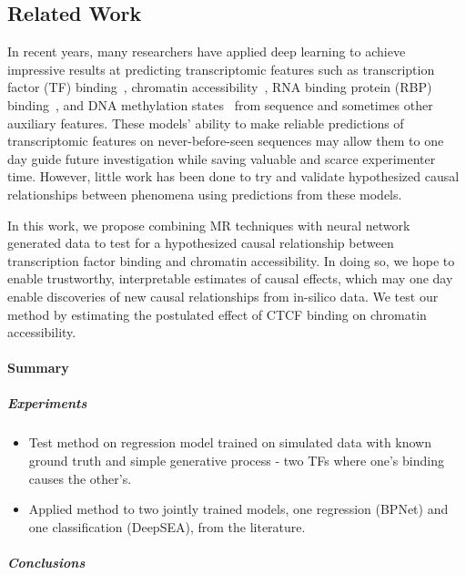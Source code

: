 \subsection{Related Work}
In recent years, many researchers have applied deep learning to achieve impressive results at predicting transcriptomic features such as transcription factor (TF) binding~\cite{alipanahi2015predicting, zhou2015predicting}, chromatin accessibility~\cite{kelley2016basset, zhou2015predicting}, RNA binding protein (RBP) binding~\cite{zheng2018deep, zhang2019deepdrbp, koo2018inferring}, and DNA methylation states~\cite{angermueller2017deepcpg} from sequence and sometimes other auxiliary features. These models' ability to make reliable predictions of transcriptomic features on never-before-seen sequences may allow them to one day guide future investigation while saving valuable and scarce experimenter time. However, little work has been done to try and validate hypothesized causal relationships between phenomena using predictions from these models. 

In this work, we propose combining MR techniques with neural network generated data to test for a hypothesized causal relationship between transcription factor binding and chromatin accessibility. In doing so, we hope to enable trustworthy, interpretable estimates of causal effects, which may one day enable discoveries of new causal relationships from in-silico data. We test our method by estimating the postulated effect of CTCF binding on chromatin accessibility.

\paragraph{Summary}
\subparagraph{Experiments}
\begin{itemize}
	\item Test method on regression model trained on simulated data with known ground truth and simple generative process - two TFs where one's binding causes the other's.
	\item Applied method to two jointly trained models, one regression (BPNet) and one classification (DeepSEA), from the literature.
\end{itemize}

\subparagraph{Conclusions}

